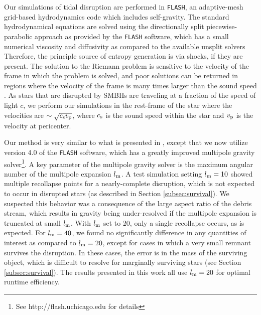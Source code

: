 \documentclass[twocolumn]{emulateapj}
\newcommand{\FLASH}{\texttt{FLASH}\xspace}
\begin{document}
Our simulations of tidal disruption are performed in \FLASH \citep{Fryxell:2000em}, an adaptive-mesh grid-based hydrodynamics code which includes self-gravity. The standard hydrodynamical equations are solved using the directionally split piecewise-parabolic approach \citep{Colella:1984wg} as provided by the \FLASH software, which has a small numerical viscosity and diffusivity as compared to the available unsplit solvers Therefore, the principle source of entropy generation is via shocks, if they are present. The solution to the Riemann problem is sensitive to the velocity of the frame in which the problem is solved, and poor solutions can be returned in regions where the velocity of the frame is many times larger than the sound speed \citep{Tasker:2008cu,Robertson:2010bk,Springel:2010hx}. As stars that are disrupted by SMBHs are traveling at a fraction of the speed of light $c$, we perform our simulations in the rest-frame of the star where the velocities are $\sim \sqrt{c_{\rm s} v_{\rm p}}$, where $c_{\rm s}$ is the sound speed within the star and $v_{\rm p}$ is the velocity at pericenter.

Our method is very similar to what is presented in \cite{Guillochon:2011be}, except that we now utilize version 4.0 of the \FLASH software, which has a greatly improved multipole gravity solver\footnote{See http://flash.uchicago.edu for details}. A key parameter of the multipole gravity solver is the maximum angular number of the multipole expansion $l_{\rm m}$. A test simulation setting $l_{\rm m} = 10$ showed multiple recollapse points for a nearly-complete disruption, which is not expected to occur in disrupted stars (as described in Section \ref{subsec:survival}). We suspected this behavior was a consequence of the large aspect ratio of the debris stream, which results in gravity being under-resolved if the multipole expansion is truncated at small $l_{\rm m}$. With $l_{\rm m}$ set to 20, only a single recollapse occurs, as is expected. For $l_{\rm m} = 40$, we found no significantly difference in any quantities of interest as compared to $l_{\rm m} = 20$, except for cases in which a very small remnant survives the disruption. In these cases, the error is in the mass of the surviving object, which is difficult to resolve for marginally surviving stars (see Section \ref{subsec:survival}). The results presented in this work all use $l_{\rm m} = 20$ for optimal runtime efficiency.
\end{document}
